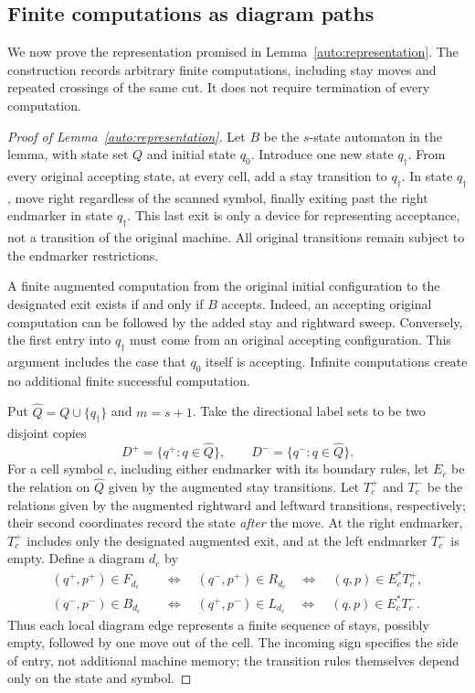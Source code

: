 \subsection{Finite computations as diagram paths}
\label{auto:finite-computations}

We now prove the representation promised in
Lemma~\ref{auto:representation}. The construction records arbitrary
finite computations, including stay moves and repeated crossings of the
same cut. It does not require termination of every computation.

\begin{proof}[Proof of Lemma~\ref{auto:representation}]
Let $B$ be the $s$-state automaton in the lemma, with state set $Q$ and
initial state $q_0$. Introduce
one new state $q_\dagger$.  From every original accepting state, at
every cell, add a stay transition to $q_\dagger$.  In state
$q_\dagger$, move right regardless of the scanned symbol, finally
exiting past the right endmarker in state $q_\dagger$.  This last exit
is only a device for representing acceptance, not a transition of the
original machine.  All original transitions remain subject to the
endmarker restrictions.

A finite augmented computation from the original initial configuration
to the designated exit exists if and only if $B$ accepts.  Indeed, an
accepting original computation can be followed by the added stay and
rightward sweep.  Conversely, the first entry into $q_\dagger$ must
come from an original accepting configuration.  This argument includes
the case that $q_0$ itself is accepting.  Infinite computations create
no additional finite successful computation.

Put $\widehat Q=Q\cup\{q_\dagger\}$ and $m=s+1$.  Take the
directional label sets to be two disjoint copies
\[
  D^+=\{q^+:q\in\widehat Q\},
  \qquad
  D^-=\{q^-:q\in\widehat Q\}.
\]
For a cell symbol $c$, including either endmarker with its boundary
rules, let $E_c$ be the relation on $\widehat Q$ given by the augmented
stay transitions.  Let $T_c^+$ and $T_c^-$ be the relations given by
the augmented rightward and leftward transitions, respectively; their second
coordinates record the state \emph{after} the move.  At the right
endmarker, $T_c^+$ includes only the designated augmented exit, and at
the left endmarker $T_c^-$ is empty.  Define a diagram $d_c$ by
\begin{align*}
 (q^+,p^+)\in F_{d_c}
 &\quad\Longleftrightarrow\quad
 (q^-,p^+)\in R_{d_c}
 \quad\Longleftrightarrow\quad
 (q,p)\in E_c^*T_c^+,\\
 (q^-,p^-)\in B_{d_c}
 &\quad\Longleftrightarrow\quad
 (q^+,p^-)\in L_{d_c}
 \quad\Longleftrightarrow\quad
 (q,p)\in E_c^*T_c^-.
\end{align*}
Thus each local diagram edge represents a finite sequence of stays,
possibly empty, followed by one move out of the cell.  The incoming
sign specifies the side of entry, not additional machine memory; the
transition rules themselves depend only on the state and symbol.


\end{proof}
